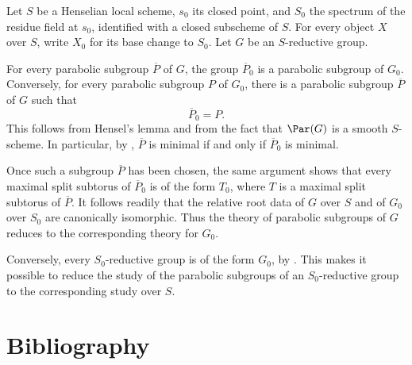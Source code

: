 
Let \(S\) be a Henselian local scheme, \(s_0\) its closed point, and
\(S_0\) the spectrum of the residue field at \(s_0\), identified
with a closed subscheme of \(S\).  For every object \(X\) over
\(S\), write \(X_0\) for its base change to \(S_0\).  Let \(G\) be
an \(S\)-reductive group.

For every parabolic subgroup \(\overline P\) of \(G\), the group
\(\overline P_0\) is a parabolic subgroup of \(G_0\).  Conversely,
for every parabolic subgroup \(P\) of \(G_0\), there is a parabolic
subgroup \(\overline P\) of \(G\) such that
\[
 \overline P_0=P.
\]
This follows from Hensel's lemma and from the fact that \(\Par(G)\)
is a smooth \(S\)-scheme.  In particular, by ,
\(\overline P\) is minimal if and only if \(\overline P_0\) is
minimal.

Once such a subgroup \(\overline P\) has been chosen, the same
argument shows that every maximal split subtorus of
\(\overline P_0\) is of the form \(T_0\), where \(T\) is a maximal
split subtorus of \(\overline P\).  It follows readily that the
relative root data of \(G\) over \(S\) and of \(G_0\) over \(S_0\)
are canonically isomorphic.  Thus the theory of parabolic subgroups
of \(G\) reduces to the corresponding theory for \(G_0\).

Conversely, every \(S_0\)-reductive group is of the form \(G_0\), by
.  This makes it possible to reduce the
study of the parabolic subgroups of an \(S_0\)-reductive group to
the corresponding study over \(S\).

\chapter*{Bibliography}

